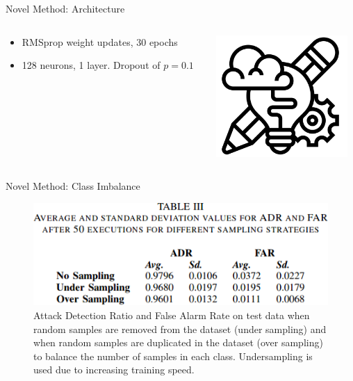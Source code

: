 \documentclass[pdf]{beamer}
\begin{document}
\begin{frame}[fragile]{Novel Method: Architecture}
\begin{minipage}[0.2\textheight]{\textwidth}
\begin{columns}[T]
\begin{column}{0.5\textwidth}
\begin{itemize}
\item RMSprop weight updates, 30 epochs
\item 128 neurons, 1 layer. Dropout of $p=0.1$
\end{itemize}
\end{column}
\begin{column}{0.5\textwidth}
\includegraphics[width=5cm]{Images/design.png}
\end{column}
\end{columns}
\end{minipage}
\end{frame}


\begin{frame}[fragile]{Novel Method: Class Imbalance}
\begin{figure}
\includegraphics[width=0.7\linewidth,keepaspectratio]{Images/sampling.png}
\caption{Attack Detection Ratio and False Alarm Rate on test data when random samples are removed from the dataset (under sampling) and when random samples are duplicated in the dataset (over sampling) to balance the number of samples in each class. Undersampling is used due to increasing training speed.}
\end{figure}
\end{frame}
\end{document}
